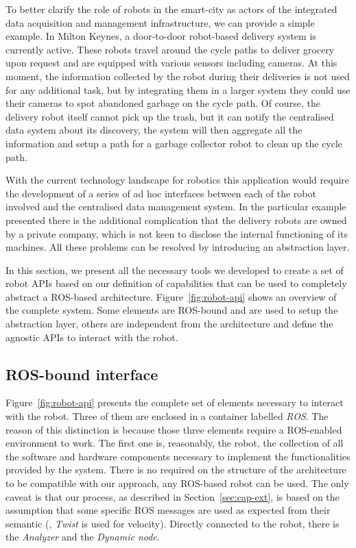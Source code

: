 To better clarify the role of robots in the smart-city as actors of the integrated data acquisition and management infrastructure, we can provide a simple example. In Milton Keynes, a door-to-door robot-based delivery system is currently active. These robots travel around the cycle paths to deliver grocery upon request and are equipped with various sensors including cameras. At this moment, the information collected by the robot during their deliveries is not used for any additional task, but by integrating them in a larger system they could use their cameras to spot abandoned garbage on the cycle path. Of course, the delivery robot itself cannot pick up the trash, but it can notify the centralised data system about its discovery, the system will then aggregate all the information and setup a path for a garbage collector robot to clean up the cycle path.

With the current technology landscape for robotics this application would require the development of a series of ad hoc interfaces between each of the robot involved and the centralised data management system. In the particular example presented there is the additional complication that the delivery robots are owned by a private company, which is not keen to disclose the internal functioning of its machines.  All these problems can be resolved by introducing an abstraction layer. 

In this section, we present all the necessary tools we developed to create a set of robot APIs based on our definition of capabilities that can be used to completely abstract a ROS-based architecture. Figure~\ref{fig:robot-api} shows an overview of the complete system. Some elements are ROS-bound and are used to setup the abstraction layer, others are independent from the architecture and define the agnostic APIs to interact with the robot.

\subsection{ROS-bound interface}
Figure~\ref{fig:robot-api} presents the complete set of elements necessary to interact with the robot. Three of them are enclosed in a container labelled \textit{ROS}. The reason of this distinction is because those three elements require a ROS-enabled environment to work. The first one is, reasonably, the robot, the collection of all the software and hardware components necessary to implement the functionalities provided by the system. There is no required on the structure of the architecture to be compatible with our approach, any ROS-based robot can be used. The only caveat is that our process, as described in Section~\ref{sec:cap-ext}, is based on the assumption that some specific ROS messages are used as expected from their semantic (\eg, \textit{Twist} is used for velocity). Directly connected to the robot, there is the \textit{Analyzer} and the \textit{Dynamic node}.

